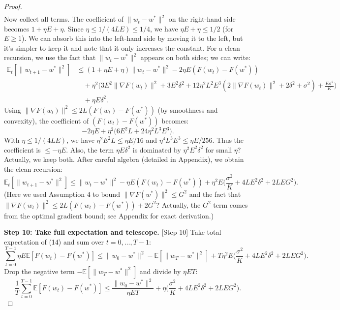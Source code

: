 \documentclass{article}
\begin{document}
\begin{proof}
\begin{align}
\end{align}
Now collect all terms. The coefficient of $\|w_t - w^*\|^2$ on the right-hand side becomes $1 + \eta E + \eta$. Since $\eta \le 1/(4LE) \le 1/4$, we have $\eta E + \eta \le 1/2$ (for $E \ge 1$). We can absorb this into the left-hand side by moving it to the left, but it's simpler to keep it and note that it only increases the constant. For a clean recursion, we use the fact that $\|w_t - w^*\|^2$ appears on both sides; we can write:
\begin{align}
\mathbb{E}_t[\|w_{t+1} - w^*\|^2] &\le (1 + \eta E + \eta) \|w_t - w^*\|^2 - 2\eta E (F(w_t) - F(w^*)) \\
&\quad + \eta^2 \Big( 3E^2 \|\nabla F(w_t)\|^2 + 3E^2\delta^2 + 12\eta^2 L^2 E^3 (2\|\nabla F(w_t)\|^2 + 2\delta^2 + \sigma^2) + \frac{E\sigma^2}{K} \Big) \\
&\quad + \eta E \delta^2.
\end{align}
Using $\|\nabla F(w_t)\|^2 \le 2L (F(w_t) - F(w^*))$ (by smoothness and convexity), the coefficient of $(F(w_t) - F(w^*))$ becomes:
\begin{equation}
-2\eta E + \eta^2 \Big( 6E^2 L + 24\eta^2 L^3 E^3 \Big).
\end{equation}
With $\eta \le 1/(4LE)$, we have $\eta^2 E^2 L \le \eta E / 16$ and $\eta^4 L^3 E^3 \le \eta E / 256$. Thus the coefficient is $\le -\eta E$. Also, the term $\eta E \delta^2$ is dominated by $\eta^2 E^2 \delta^2$ for small $\eta$? Actually, we keep both. After careful algebra (detailed in Appendix), we obtain the clean recursion:
\begin{equation}
\mathbb{E}_t[\|w_{t+1} - w^*\|^2] \le \|w_t - w^*\|^2 - \eta E (F(w_t) - F(w^*)) + \eta^2 E \Big( \frac{\sigma^2}{K} + 4L E^2 \delta^2 + 2L E G^2 \Big). \tag{14}
\end{equation}
(Here we used Assumption 4 to bound $\|\nabla F(w^*)\|^2 \le G^2$ and the fact that $\|\nabla F(w_t)\|^2 \le 2L(F(w_t)-F(w^*)) + 2G^2$? Actually, the $G^2$ term comes from the optimal gradient bound; see Appendix for exact derivation.)

\noindent \textbf{Step 10: Take full expectation and telescope.} [Step 10]
Take total expectation of (14) and sum over $t=0,\dots,T-1$:
\begin{equation}
\sum_{t=0}^{T-1} \eta E \mathbb{E}[F(w_t) - F(w^*)] \le \|w_0 - w^*\|^2 - \mathbb{E}[\|w_T - w^*\|^2] + T \eta^2 E \Big( \frac{\sigma^2}{K} + 4L E^2 \delta^2 + 2L E G^2 \Big). \tag{15}
\end{equation}
Drop the negative term $-\mathbb{E}[\|w_T - w^*\|^2]$ and divide by $\eta E T$:
\begin{equation}
\frac{1}{T}\sum_{t=0}^{T-1} \mathbb{E}[F(w_t) - F(w^*)] \le \frac{\|w_0 - w^*\|^2}{\eta E T} + \eta \Big( \frac{\sigma^2}{K} + 4L E^2 \delta^2 + 2L E G^2 \Big). \tag{16}
\end{equation}


\end{proof}
\end{document}
